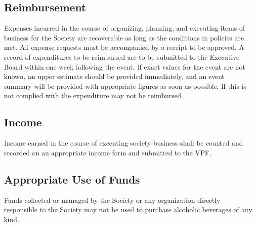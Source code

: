 \subsection{Reimbursement}
Expenses incurred in the course of organizing, planning, and executing items of business for the Society are recoverable as long as the conditions in policies are met.
All expense requests must be accompanied by a receipt to be approved.
A record of expenditures to be reimbursed are to be submitted to the Executive Board within one week following the event. If exact values for the event are not known, an upper estimate should be provided immediately, and an event summary will be provided with appropriate figures as soon as possible. If this is not complied with the expenditure may not be reimbursed.

\subsection{Income}
Income earned in the course of executing society business shall be counted and recorded on an appropriate income form and submitted to the VPF.

\subsection{Appropriate Use of Funds}
Funds collected or managed by the Society or any organization directly responsible to the Society may not be used to purchase alcoholic beverages of any kind.